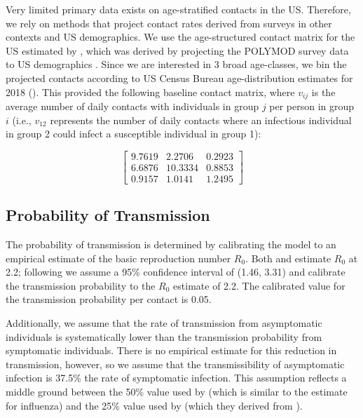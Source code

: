 \documentclass[12pt]{article}
\begin{document}
Very limited primary data exists on age-stratified contacts in the US. Therefore, we rely on methods that project contact rates derived from surveys in other contexts and US demographics. We use the age-structured contact matrix for the US estimated by \cite{prem2017projecting}, which was derived by projecting the POLYMOD \cite{mossong2008social,mossong2017polymod} survey data to US demographics \cite{prem2017projecting}. Since we are interested in 3 broad age-classes, we bin the projected contacts according to US Census Bureau age-distribution estimates for 2018 (\cite{censusbureau}). This provided the following baseline contact matrix, where \(v_{ij}\) is the average number of daily contacts with individuals in group \(j\) per person in group \(i\) (i.e., \(v_{12}\) represents the number of daily contacts where an infectious individual in group 2 could infect a susceptible individual in group 1):

\begin{equation*}
    \begin{bmatrix}
9.7619 & 2.2706 & 0.2923\\
6.6876 & 10.3334 & 0.8853\\
0.9157 & 1.0141 & 1.2495
\end{bmatrix}
\end{equation*}

\subsection{Probability of Transmission}
The probability of transmission is determined by calibrating the model to an empirical estimate of the basic reproduction number \(R_0\). Both \citet{li_early_2020} and \citet{Riou_R0} estimate \(R_0\) at 2.2; following \citet{peak_modeling_2020} we assume a 95\% confidence interval of (1.46, 3.31) and calibrate the transmission probability to the \(R_0\) estimate of 2.2. The calibrated value for the transmission probability per contact is 0.05.

Additionally, we assume that the rate of transmission from asymptomatic individuals is systematically lower than the transmission probability from symptomatic individuals. There is no empirical estimate for this reduction in transmission, however, so we assume that the transmissibility of asymptomatic infection is 37.5\% the rate of symptomatic infection. This assumption reflects a middle ground between the 50\% value used by \citet{Zhao2020} (which is similar to the estimate for influenza) and the 25\% value used by \citet{Prem2020} (which they derived from \citet{Liu2020}).
\end{document}
